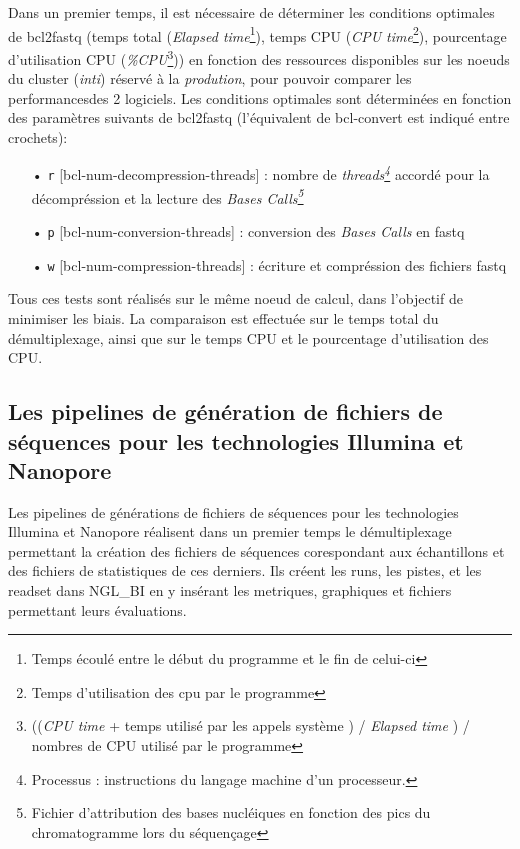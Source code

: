 Dans un premier temps, il est nécessaire de déterminer les conditions optimales de bcl2fastq (temps total (\emph{Elapsed time}\footnote{Temps écoulé entre le début du programme et le fin de celui-ci}), temps CPU (\emph{CPU time}\footnote{Temps d'utilisation des cpu par le programme}), pourcentage d'utilisation CPU (\emph{\%CPU}\footnote{((\emph{CPU time} + temps utilisé par les appels système ) / \emph{Elapsed time} ) / nombres de CPU utilisé par le programme})) en fonction des ressources disponibles sur les noeuds du cluster (\emph{inti}) réservé à la \emph{prodution}, pour pouvoir comparer les performancesdes 2 logiciels. Les conditions optimales sont déterminées en fonction des paramètres suivants de bcl2fastq (l'équivalent de bcl-convert est indiqué entre crochets): \\
\begin{itemize}
    \item[•] \texttt{r} [bcl-num-decompression-threads] : nombre de \emph{threads\footnote{Processus : instructions du langage machine d'un processeur.}} accordé pour la décompréssion et la lecture des \emph{Bases Calls\footnote{Fichier d'attribution des bases nucléiques en fonction des pics du chromatogramme lors du séquençage}}
    \item[•] \texttt{p} [bcl-num-conversion-threads] : conversion des \emph{Bases Calls} en fastq
    \item[•] \texttt{w} [bcl-num-compression-threads] : écriture et compréssion des fichiers fastq\\
\end{itemize}

Tous ces tests sont réalisés sur le même noeud de calcul, dans l'objectif de minimiser les biais. La comparaison est effectuée sur le temps total du démultiplexage, ainsi que sur le temps CPU et le pourcentage d'utilisation des CPU.

\subsection{Les pipelines de génération de fichiers de séquences pour les technologies Illumina et Nanopore}
Les pipelines de générations de fichiers de séquences pour les technologies Illumina et Nanopore réalisent dans un premier temps le démultiplexage permettant la création des fichiers de séquences corespondant aux échantillons et des fichiers de statistiques de ces derniers. Ils créent les runs, les pistes, et les readset dans NGL\_BI en y insérant les metriques, graphiques et fichiers permettant leurs évaluations.\\

